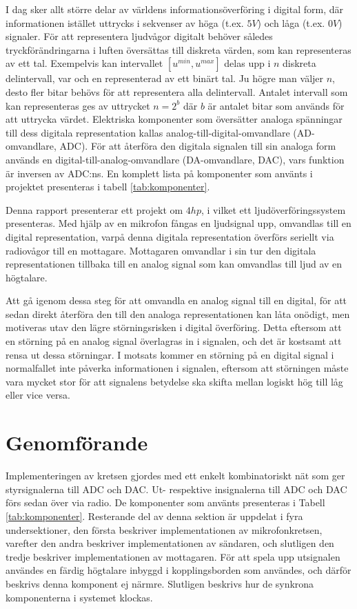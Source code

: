 \documentclass[a4paper,10pt]{article}
\begin{document}
I dag sker allt större delar av världens informationsöverföring i digital form, 
där informationen istället uttrycks i sekvenser av höga (t.ex. $5V$) och låga
(t.ex. $0V$) signaler. För att representera ljudvågor digitalt behöver således 
tryckförändringarna i luften översättas till diskreta värden, som kan 
representeras av ett tal.
Exempelvis kan intervallet $[u^{min}, u^{max}]$ delas upp i $n$ diskreta 
delintervall, var och en representerad av ett binärt tal. Ju högre man väljer
$n$, desto fler bitar behövs för att representera alla delintervall. Antalet 
intervall som kan representeras ges av uttrycket $n = 2^b$ där $b$ är antalet 
bitar som används för att uttrycka värdet. Elektriska komponenter som översätter
analoga spänningar till dess digitala representation kallas 
analog-till-digital-omvandlare (AD-omvandlare, ADC). 
För att återföra den digitala signalen till sin analoga form används en
digital-till-analog-omvandlare (DA-omvandlare, DAC), vars funktion är
inversen av ADC:ns. En komplett lista på komponenter som använts i projektet
presenteras i tabell \ref{tab:komponenter}.

Denna rapport presenterar ett projekt om $4 hp$, i vilket ett 
ljudöverföringssystem presenteras. Med hjälp av en mikrofon fångas en 
ljudsignal upp, omvandlas till en digital representation, varpå denna digitala 
representation överförs seriellt via radiovågor till en mottagare. Mottagaren 
omvandlar i sin tur den digitala representationen tillbaka till en analog signal 
som kan omvandlas till ljud av en högtalare.

Att gå igenom dessa steg för att omvandla en analog signal till en digital, för
att sedan direkt återföra den till den analoga representationen kan låta 
onödigt, men motiveras utav den lägre störningsrisken i digital överföring. 
Detta eftersom att en störning på en analog signal överlagras in i signalen, och
det är kostsamt att rensa ut dessa störningar. I motsats kommer en störning på
en digital signal i normalfallet inte påverka informationen i signalen, eftersom
att störningen måste vara mycket stor för att signalens betydelse ska skifta
mellan logiskt hög till låg eller vice versa.


\section{Genomförande}

Implementeringen av kretsen gjordes med ett enkelt kombinatoriskt nät som ger
styrsignalerna till ADC och DAC. Ut- respektive insignalerna till ADC och DAC
förs sedan över via radio. De komponenter som använts presenteras i Tabell 
\ref{tab:komponenter}. Resterande del av denna sektion är uppdelat i fyra
undersektioner, den första beskriver implementationen av mikrofonkretsen, 
varefter den andra beskriver implementationen av sändaren, och slutligen den 
tredje beskriver implementationen av mottagaren. För att spela upp
utsignalen användes en färdig högtalare inbyggd i kopplingsborden som användes,
och därför beskrivs denna komponent ej närmre. Slutligen beskrivs hur de 
synkrona komponenterna i systemet klockas.
\end{document}
